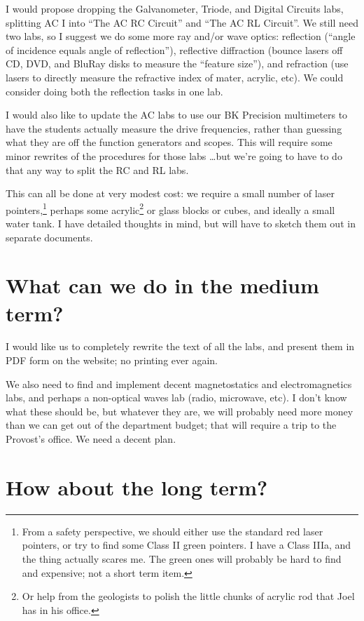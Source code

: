 \documentclass[12pt]{article}
\begin{document}
I would propose dropping the Galvanometer, Triode, and Digital
Circuits labs, splitting AC I into ``The AC RC Circuit'' and ``The AC
RL Circuit''.  We still need two labs, so I suggest we do some more
ray and/or wave optics: reflection (``angle of incidence equals angle
of reflection''), reflective diffraction (bounce lasers off CD, DVD,
and BluRay disks to measure the ``feature size''), and refraction
(use lasers to directly measure the refractive index of mater,
acrylic, etc).  We could consider doing both the reflection tasks in
one lab.

I would also like to update the AC labs to use our BK Precision
multimeters to have the students actually measure the drive
frequencies, rather than guessing what they are off the function
generators and scopes.  This will require some minor rewrites of the
procedures for those labs \ldots but we're going to have to do that
any way to split the RC and RL labs.

This can all be done at very modest cost: we require a small number of
laser pointers,\footnote{From a safety perspective, we should either
  use the standard red laser pointers, or try to find some Class II
  green pointers.  I have a Class IIIa, and the thing actually scares
  me.  The green ones will probably be hard to find and expensive; not
  a short term item.} perhaps some acrylic\footnote{Or help from the
  geologists to polish the little chunks of acrylic rod that Joel has
  in his office.} or glass blocks or cubes, and ideally a small water
tank.  I have detailed thoughts in mind, but will have to sketch them
out in separate documents.

\section{What can we do in the medium term?}
\label{sec:midterm}

I would like us to completely rewrite the text of all the labs, and
present them in PDF form on the website; no printing ever again.  

We also need to find and implement decent magnetostatics and
electromagnetics labs, and perhaps a non-optical waves lab (radio,
microwave, etc).  I don't know what these should be, but whatever they
are, we will probably need more money than we can get out of the
department budget; that will require a trip to the Provost's office.
We need a decent plan.

\section{How about the long term?}
\label{sec:longterm}
\end{document}
